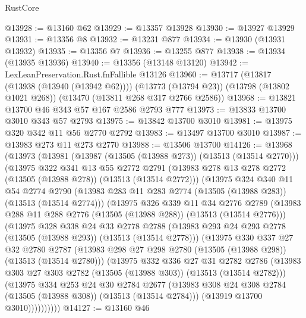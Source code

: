 \begin{lexlean}{RustCore}
\begin{coremodule}
@13928 := @13160 @62
@13929 := @13357 @13928
@13930 := @13927 @13929
@13931 := @13356 @8
@13932 := @13231 @877
@13934 := @13930 (@13931 @13932)
@13935 := @13356 @7
@13936 := @13255 @877
@13938 := @13934 (@13935 @13936)
@13940 := @13356 (@13148 @13120)
@13942 := LexLeanPreservation.Rust.fnFallible @13126
@13960 := @13717
    (@13817 (@13938 (@13940 (@13942 @62))))
    (@13773 (@13794 @23))
    (@13798 (@13802 @1021 @268))
    (@13470 (@13811 @268 @317 @2766 @2586))
@13968 := @13821 @13700 @46 @343 @57 @167 @2586 @2793 @777
@13973 := @13833 @13700 @3010 @343 @57 @2793
@13975 := @13842 @13700 @3010
@13981 := @13975 @320 @342 @11 @56 @2770 @2792
@13983 := @13497 @13700 @3010
@13987 := @13983 @273 @11 @273 @2770
@13988 := @13506 @13700
@14126 := @13968
    (@13973
      (@13981
        (@13987 (@13505 (@13988 @273)) (@13513 (@13514 @2770)))
        (@13975
          @322
          @341
          @13
          @55
          @2772
          @2791
          (@13983 @278 @13 @278 @2772 (@13505 (@13988 @278)) (@13513 (@13514 @2772)))
          (@13975
            @324
            @340
            @11
            @54
            @2774
            @2790
            (@13983 @283 @11 @283 @2774 (@13505 (@13988 @283)) (@13513 (@13514 @2774)))
            (@13975
              @326
              @339
              @11
              @34
              @2776
              @2789
              (@13983 @288 @11 @288 @2776 (@13505 (@13988 @288)) (@13513 (@13514 @2776)))
              (@13975
                @328
                @338
                @24
                @33
                @2778
                @2788
                (@13983 @293 @24 @293 @2778 (@13505 (@13988 @293)) (@13513 (@13514 @2778)))
                (@13975
                  @330
                  @337
                  @27
                  @32
                  @2780
                  @2787
                  (@13983 @298 @27 @298 @2780 (@13505 (@13988 @298)) (@13513 (@13514 @2780)))
                  (@13975
                    @332
                    @336
                    @27
                    @31
                    @2782
                    @2786
                    (@13983 @303 @27 @303 @2782 (@13505 (@13988 @303)) (@13513 (@13514 @2782)))
                    (@13975
                      @334
                      @253
                      @24
                      @30
                      @2784
                      @2677
                      (@13983 @308 @24 @308 @2784 (@13505 (@13988 @308)) (@13513 (@13514 @2784)))
                      (@13919 @13700 @3010))))))))))
@14127 := @13160 @46

\end{coremodule}
\end{lexlean}
